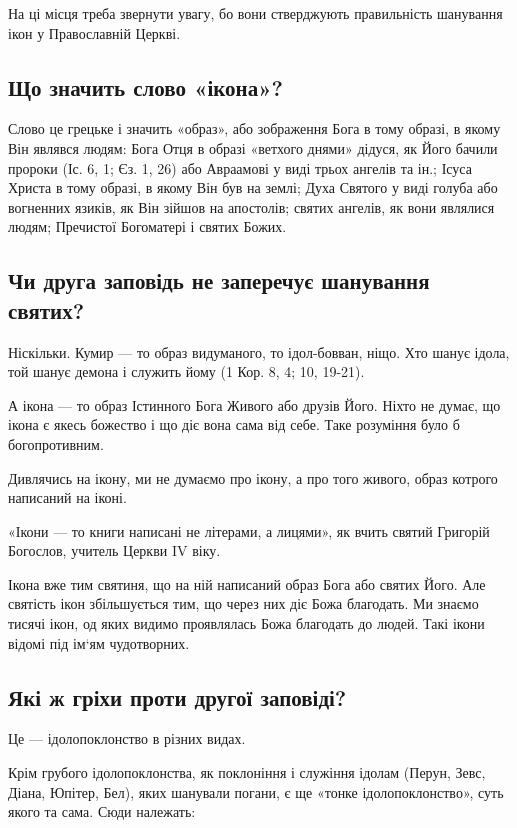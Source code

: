 \documentclass[main.tex]{subfiles}
\begin{document}
На ці місця треба звернути увагу, бо вони стверджують правильність шанування ікон у Православній Церкві.

\subsection{Що значить слово «ікона»?}

Слово це грецьке і значить «образ», або зображення Бога в тому образі, в якому Він являвся людям: Бога Отця в образі «ветхого днями» дідуся, як Його бачили пророки (Іс. 6, 1; Єз. 1, 26) або Авраамові у виді трьох ангелів та ін.; Ісуса Христа в тому образі, в якому Він був на землі; Духа Святого у виді голуба або вогненних язиків, як Він зійшов на апостолів; святих ангелів, як вони являлися людям; Пречистої Богоматері і святих Божих.

\subsection{Чи друга заповідь не заперечує шанування святих?}

Ніскільки. Кумир — то образ видуманого, то ідол-бовван, ніщо. Хто шанує ідола, той шанує демона і служить йому (1 Кор. 8, 4; 10, 19-21).

А ікона — то образ Істинного Бога Живого або друзів Його. Ніхто не думає, що ікона є якесь божество і що діє вона сама від себе. Таке розуміння було б богопротивним.

Дивлячись на ікону, ми не думаємо про ікону, а про того живого, образ котрого написаний на іконі.

«Ікони — то книги написані не літерами, а лицями», як вчить святий Григорій Богослов, учитель Церкви IV віку.

Ікона вже тим святиня, що на ній написаний образ Бога або святих Його. Але святість ікон збільшується тим, що через них діє Божа благодать. Ми знаємо тисячі ікон, од яких видимо проявлялась Божа благодать до людей. Такі ікони відомі під ім`ям чудотворних.

\subsection{Які ж гріхи проти другої заповіді?}

Це — ідолопоклонство в різних видах.

Крім грубого ідолопоклонства, як поклоніння і служіння ідолам (Перун, Зевс, Діана, Юпітер, Бел), яких шанували погани, є ще «тонке ідолопоклонство», суть якого та сама. Сюди належать:
\end{document}
